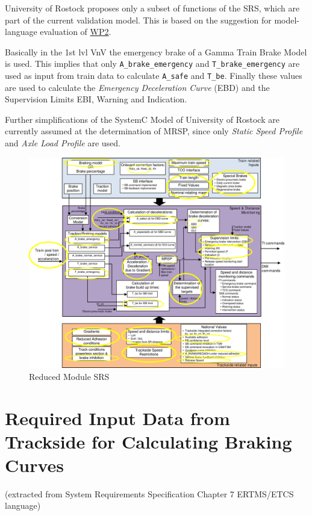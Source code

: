 \documentclass{template/openetcs_article}
\begin{document}
University of Rostock proposes only a subset of functions of the SRS, which are part of the current validation model. This is based on the suggestion for model-language evaluation of \href{https://github.com/openETCS/requirements/blob/master/D2.5/D2.5\%20Methods\%20and\%20tools\%20benchmarking\%20methodology.pdf}{WP2}.

Basically in the 1st lvl VnV the emergency brake of a Gamma Train Brake Model is used. This implies that only \texttt{A\_brake\_emergency} and \texttt{T\_brake\_emergency} are used as input from train data to calculate \texttt{A\_safe} and \texttt{T\_be}. Finally these values are used to calculate the \emph{Emergency Deceleration Curve} (EBD) and the Supervision Limits EBI, Warning and Indication.

Further simplifications of the SystemC Model of University of Rostock are currently assumed at the determination of MRSP, since only \emph{Static Speed Profile} and  \emph{Axle Load Profile} are used.
 

\begin{figure}[htb]
  \centering
  \includegraphics[width=.9\textwidth]{images/reduced_Module_SRS.png}
  \caption{Reduced Module SRS}
  \label{fig:openETCSProcess}
\end{figure}

\section{Required Input Data from Trackside for Calculating Braking Curves}
(extracted from System Requirements Specification Chapter 7 ERTMS/ETCS language)
\end{document}

